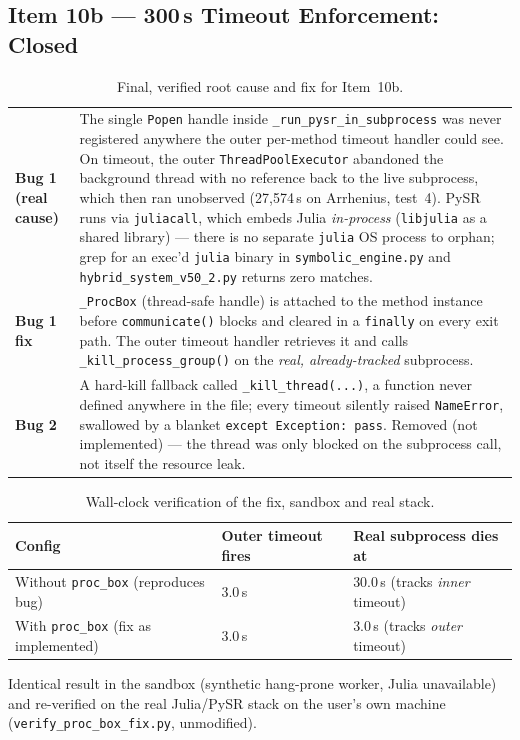 \documentclass[twoside,11pt]{article}
\begin{document}
\subsection{Item 10b --- 300\,s Timeout Enforcement: Closed}
\label{sec:findings:item10b}

\begin{table}[h]
\centering
\caption{Final, verified root cause and fix for Item~10b.}
\label{tab:10b-final}
\small
\begin{tabular}{L{2.6cm} L{9.4cm}}
\toprule
\textbf{Bug 1 (real cause)} & The single \texttt{Popen} handle inside
  \texttt{\_run\_pysr\_in\_subprocess} was never registered anywhere
  the outer per-method timeout handler could see. On timeout, the
  outer \texttt{ThreadPoolExecutor} abandoned the background thread
  with no reference back to the live subprocess, which then ran
  unobserved (27{,}574\,s on Arrhenius, test~4). PySR runs via
  \texttt{juliacall}, which embeds Julia \emph{in-process}
  (\texttt{libjulia} as a shared library) --- there is no separate
  \texttt{julia} OS process to orphan; grep for an exec'd \texttt{julia}
  binary in \texttt{symbolic\_engine.py} and
  \texttt{hybrid\_system\_v50\_2.py} returns zero matches. \\
\textbf{Bug 1 fix} & \texttt{\_ProcBox} (thread-safe handle) is attached
  to the method instance before \texttt{communicate()} blocks and
  cleared in a \texttt{finally} on every exit path. The outer timeout
  handler retrieves it and calls \texttt{\_kill\_process\_group()} on
  the \emph{real, already-tracked} subprocess. \\
\textbf{Bug 2} & A hard-kill fallback called \texttt{\_kill\_thread(...)},
  a function never defined anywhere in the file; every timeout silently
  raised \texttt{NameError}, swallowed by a blanket
  \texttt{except Exception: pass}. Removed (not implemented) --- the
  thread was only blocked on the subprocess call, not itself the
  resource leak. \\
\bottomrule
\end{tabular}
\end{table}

\begin{table}[h]
\centering
\caption{Wall-clock verification of the fix, sandbox and real stack.}
\label{tab:10b-verify}
\small
\begin{tabular}{L{5.2cm} C{2.4cm} C{3.2cm}}
\toprule
\textbf{Config} & \textbf{Outer timeout fires} & \textbf{Real subprocess dies at} \\
\midrule
Without \texttt{proc\_box} (reproduces bug) & 3.0\,s & 30.0\,s (tracks \emph{inner} timeout) \\
With \texttt{proc\_box} (fix as implemented) & 3.0\,s & 3.0\,s (tracks \emph{outer} timeout) \\
\bottomrule
\end{tabular}

\vspace{4pt}
{\small Identical result in the sandbox (synthetic hang-prone worker,
Julia unavailable) and re-verified on the real Julia/PySR stack on the
user's own machine (\texttt{verify\_proc\_box\_fix.py}, unmodified).}
\end{table}
\end{document}
